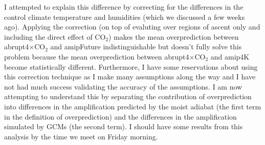 \documentclass{article}
\begin{document}
I attempted to explain this difference by correcting for the differences in the control climate temperature and humidities (which we discussed a few weeks ago). Applying the correction (on top of evaluting over regions of ascent only and including the direct effect of CO$_2$) makes the mean overprediction between abrupt4$\times$CO$_2$ and amipFuture indistinguishable but doesn't fully solve this problem because the mean overprediction between abrupt4$\times$CO$_2$ and amip4K become statistically different. Furthermore, I have some reservations about using this correction technique as I make many assumptions along the way and I have not had much success validating the accuracy of the assumptions. I am now attempting to understand this by separating the contribution of overprediction into differences in the amplification predicted by the moist adiabat (the first term in the definition of overprediction) and the differences in the amplification simulated by GCMs (the second term). I should have some results from this analysis by the time we meet on Friday morning.



\end{document}
